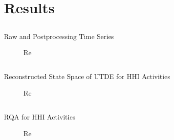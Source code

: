 


\section{Results}

\subsection{}
{

\begin{frame}{Raw and Postprocessing Time Series}
    \begin{figure}
	\caption{Re} 
   \end{figure}
	
\end{frame}
}


\subsection{}
{

\begin{frame}{Reconstructed State Space of UTDE for HHI Activities}
    \begin{figure}
	\caption{Re} 
   \end{figure}
	
\end{frame}
}


\subsection{}
{

\begin{frame}{RQA for HHI Activities}
    \begin{figure}
	\caption{Re} 
   \end{figure}
	
\end{frame}
}

